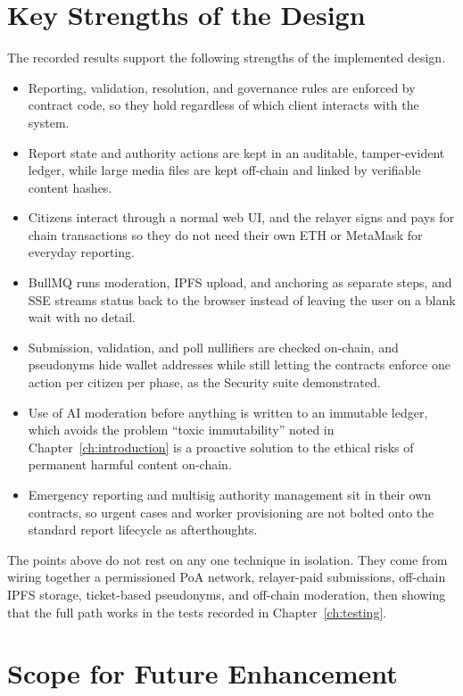 \section{Key Strengths of the Design}
\label{sec:design-benefits}

The recorded results support the following strengths of the implemented design.

\begin{itemize}
    \item Reporting, validation, resolution, and governance rules are enforced by contract code, so they hold regardless of which client interacts with the system.
    \item Report state and authority actions are kept in an auditable, tamper-evident ledger, while large media files are kept off-chain and linked by verifiable content hashes.
    \item Citizens interact through a normal web \ac{UI}, and the relayer signs and pays for chain transactions so they do not need their own ETH or MetaMask for everyday reporting.
    \item BullMQ runs moderation, \ac{IPFS} upload, and anchoring as separate steps, and \ac{SSE} streams status back to the browser instead of leaving the user on a blank wait with no detail.
    \item Submission, validation, and poll nullifiers are checked on-chain, and pseudonyms hide wallet addresses while still letting the contracts enforce one action per citizen per phase, as the Security suite demonstrated.
    \item Use of AI moderation before anything is written to an immutable ledger, which avoids the problem ``toxic immutability'' noted in Chapter~\ref{ch:introduction} is a proactive solution to the ethical risks of permanent harmful content on-chain.
    \item Emergency reporting and multisig authority management sit in their own contracts, so urgent cases and worker provisioning are not bolted onto the standard report lifecycle as afterthoughts.
\end{itemize}

The points above do not rest on any one technique in isolation. They come from wiring together a permissioned \ac{PoA} network, relayer-paid submissions, off-chain \ac{IPFS} storage, ticket-based pseudonyms, and off-chain moderation, then showing that the full path works in the tests recorded in Chapter~\ref{ch:testing}.

\section{Scope for Future Enhancement}
\label{sec:results-scope}


